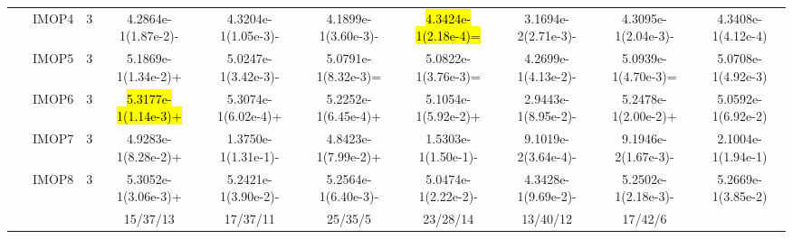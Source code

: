 \documentclass[a4paper,fleqn]{cas-dc}
\newcommand{\highlight}[1]{
	\begingroup
	\sethlcolor{Seashell}%
	\hl{#1}%
	\endgroup
}
\begin{document}
\begin{sloppypar}
\begin{table}[ht]
{\begin{tabular}{cccccccccc}
					
					
					
					\multirow{8}{*}{~}&{IMOP4} &3  &4.2864e-1(1.87e-2)-		&4.3204e-1(1.05e-3)-	&4.1899e-1(3.60e-3)-	&\highlight{4.3424e-1(2.18e-4)=}	&3.1694e-2(2.71e-3)-	&4.3095e-1(2.04e-3)-	&4.3408e-1(4.12e-4)\\ 
					
					\multirow{8}{*}{~}&{IMOP5} &3 &5.1869e-1(1.34e-2)+ &5.0247e-1(3.42e-3)-	&5.0791e-1(8.32e-3)=	&5.0822e-1(3.76e-3)=	&4.2699e-1(4.13e-2)-	&5.0939e-1(4.70e-3)=	&5.0708e-1(4.92e-3)\\
					
					\multirow{8}{*}{~}&{IMOP6} &3 &\highlight{5.3177e-1(1.14e-3)+} 	&5.3074e-1(6.02e-4)+	&5.2252e-1(6.45e-4)+	&5.1054e-1(5.92e-2)+	&2.9443e-1(8.95e-2)-	&5.2478e-1(2.00e-2)+	&5.0592e-1(6.92e-2)\\
					
					
					
					\multirow{8}{*}{~}&{IMOP7} &3 &4.9283e-1(8.28e-2)+	&1.3750e-1(1.31e-1)-	&4.8423e-1(7.99e-2)+	&1.5303e-1(1.50e-1)-	&9.1019e-2(3.64e-4)-	&9.1946e-2(1.67e-3)-	&2.1004e-1(1.94e-1)\\
					
					\multirow{8}{*}{~}&{IMOP8} &3 &5.3052e-1(3.06e-3)+ 	&5.2421e-1(3.90e-2)-	&5.2564e-1(6.40e-3)-	&5.0474e-1(2.22e-2)-	&4.3428e-1(9.69e-2)-	&5.2502e-1(2.18e-3)-	&5.2669e-1(3.85e-2)\\
					
					
					\hline				                                                                                                    
					$+/-/\approx$&~&~ &15/37/13 &17/37/11	&25/35/5	&23/28/14	&13/40/12	&17/42/6 &~\\
					\hline
				\end{tabular}
			}
			
		\end{table}
		
		\begin{table}[ht]
			\centering
			\caption{ {IGD+ values obtained by TS-MOEA-EPF and  {7 of 13} MaOEAs on ZCAT,  where ``+'', ``-'', and ``='' respectively represent the comparison algorithms being superior, inferior, and equivalent to TS-MOEA-EPF (Part I) }}\label{table:The average IGDp on ZCAT_1}
\end{table}
\end{sloppypar}
\end{document}
